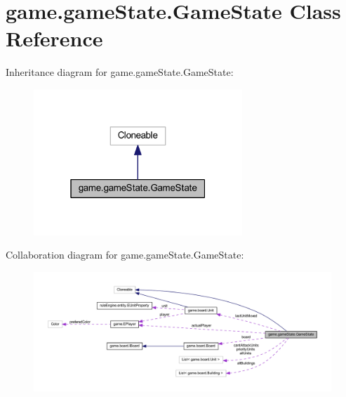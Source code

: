 \hypertarget{classgame_1_1game_state_1_1_game_state}{}\section{game.\+game\+State.\+Game\+State Class Reference}
\label{classgame_1_1game_state_1_1_game_state}


Inheritance diagram for game.\+game\+State.\+Game\+State\+:
\nopagebreak
\begin{figure}[H]
\begin{center}
\leavevmode
\includegraphics[width=223pt]{classgame_1_1game_state_1_1_game_state__inherit__graph}
\end{center}
\end{figure}


Collaboration diagram for game.\+game\+State.\+Game\+State\+:
\nopagebreak
\begin{figure}[H]
\begin{center}
\leavevmode
\includegraphics[width=350pt]{classgame_1_1game_state_1_1_game_state__coll__graph}
\end{center}
\end{figure}
